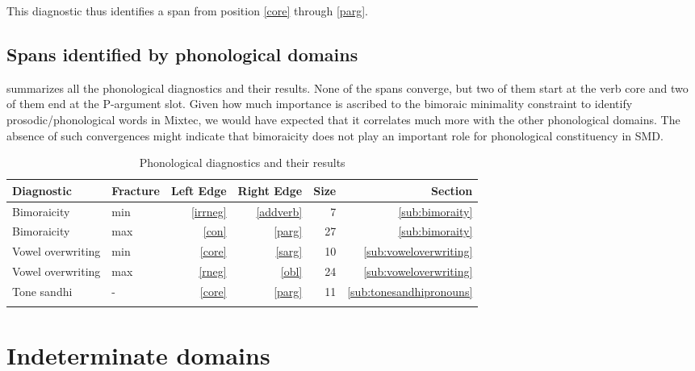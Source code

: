 \documentclass[output=paper]{langscibook}
\begin{document}
This diagnostic thus identifies a span from position \ref{core} through \ref{parg}.





\subsection{Spans identified by phonological domains}
\label{sub:phonspans}

 summarizes all the phonological diagnostics and their results.
None of the spans converge, but two of them start at the verb core and two of them end at the P-argument slot. 
Given how much importance is ascribed to the bimoraic minimality constraint to identify prosodic/phonological words in Mixtec, we would have expected that it correlates much more with the other phonological domains. 
The absence of such convergences might indicate that bimoraicity does not play an important role for phonological constituency in SMD.


\begin{table}
\caption{Phonological diagnostics and their results}
\label{tab:phontests}
    \begin{tabularx}{\textwidth}{Xlrrrr} \lsptoprule
    \textbf{Diagnostic}                & \textbf{Fracture}  & \textbf{Left Edge} & \textbf{Right Edge} & \textbf{Size} & \textbf{Section} \\ 
    \midrule
Bimoraicity           & min       & \ref{irrneg}     & \ref{addverb} & 7      & \ref{sub:bimoraity} \\
Bimoraicity           & max       & \ref{con}  & \ref{parg}    & 27     & \ref{sub:bimoraity}        \\
Vowel overwriting   & min       & \ref{core}    & \ref{sarg}    & 10     & \ref{sub:voweloverwriting} \\
Vowel overwriting   & max       & \ref{rneg}    & \ref{obl}     & 24     & \ref{sub:voweloverwriting} \\
Tone sandhi         & -             & \ref{core}    & \ref{parg}    & 11     & \ref{sub:tonesandhipronouns}\\ 
    \lspbottomrule
    \end{tabularx}
\end{table}



\section{Indeterminate domains} %
\label{sec:indeterminatedomains}
\end{document}
